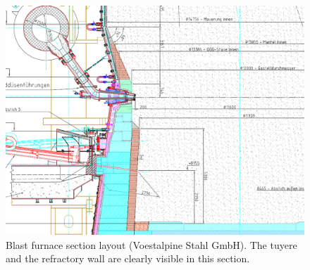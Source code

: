 \begin{figure}[!htb]
\centering
\includegraphics[width=.80\columnwidth]{images/068racewaylayout}
\caption[Blast furnace section layout]{Blast furnace section layout (Voestalpine
Stahl GmbH). The tuyere and the refractory wall are clearly visible in this
section.}
\label{fig:068racewaylayout}
\end{figure}